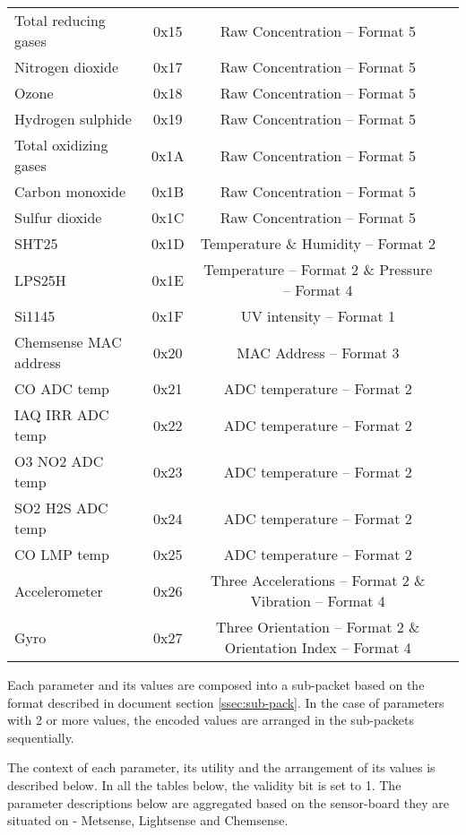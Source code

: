 \begin{center}
\begin{longtable}{|l|c|c|l|}
     \hline \rowcolor{white} \multicolumn{4}{|c|}{{Chemsense board}} \\ \hline
        Total reducing gases & 0x15 & Raw Concentration -- Format 5\\
        Nitrogen dioxide & 0x17 & Raw Concentration -- Format 5\\
        Ozone & 0x18 & Raw Concentration -- Format 5\\
        Hydrogen sulphide & 0x19 & Raw Concentration -- Format 5\\
        Total oxidizing gases & 0x1A & Raw Concentration -- Format 5\\
        Carbon monoxide & 0x1B & Raw Concentration -- Format 5\\
        Sulfur dioxide & 0x1C & Raw Concentration -- Format 5\\
        SHT25 & 0x1D & Temperature \& Humidity -- Format 2\\
        LPS25H & 0x1E & Temperature -- Format 2 \& Pressure -- Format 4\\
        Si1145 & 0x1F & UV intensity -- Format 1\\
        Chemsense MAC address & 0x20 & MAC Address -- Format 3\\
        CO ADC temp & 0x21 & ADC temperature -- Format 2\\
        IAQ IRR ADC temp & 0x22 & ADC temperature -- Format 2\\
        O3 NO2 ADC temp & 0x23 & ADC temperature -- Format 2\\
        SO2 H2S ADC temp & 0x24 & ADC temperature -- Format 2\\
        CO LMP temp & 0x25 & ADC temperature -- Format 2\\
        Accelerometer & 0x26 & Three Accelerations -- Format 2 \& Vibration -- Format 4\\
        Gyro & 0x27 & Three Orientation -- Format 2 \& Orientation Index -- Format 4\\
\end{longtable}
\end{center}

Each parameter and its values are composed into a sub-packet based on
the format described in document section \ref{ssec:sub-pack}.
In the case of parameters with 2 or more values, the encoded values are
arranged in the sub-packets sequentially. 
\par
The context of each parameter, its utility and the arrangement of its values is described below. In all
the tables below, the validity bit is set to 1. The parameter descriptions
below are aggregated based on the sensor-board they are situated on -
Metsense, Lightsense and Chemsense.

